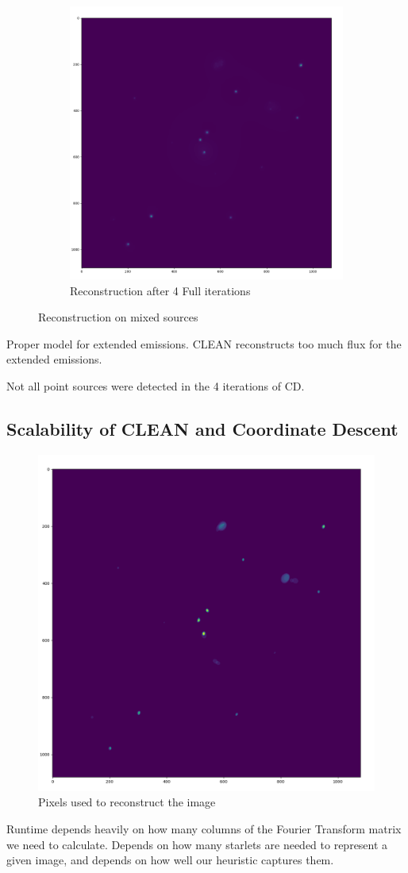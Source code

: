 \begin{figure}[h]
\begin{subfigure}[b]{0.45\linewidth}
		\includegraphics[width=\linewidth]{./chapters/05.algorithms/results/image4.png}
		\caption{Reconstruction after 4 Full iterations}
		\label{results:g55:nrao:dirty}
	\end{subfigure}
	\caption{Reconstruction on mixed sources}
	\label{results:mixed}
\end{figure}

Proper model for extended emissions. CLEAN reconstructs too much flux for the extended emissions.

Not all point sources were detected in the 4 iterations of CD.



\subsection{Scalability of CLEAN and Coordinate Descent}


\begin{figure}[h]
	\centering
	\includegraphics[width=0.5\linewidth]{./chapters/05.algorithms/sim00/full_cache_debug.png}
	\caption{Pixels used to reconstruct the image}
	\label{results:pixels:used}
\end{figure}
Runtime depends heavily on how many columns of the Fourier Transform matrix we need to calculate. Depends on how many starlets are needed to represent a given image, and depends on how well our heuristic captures them. 

